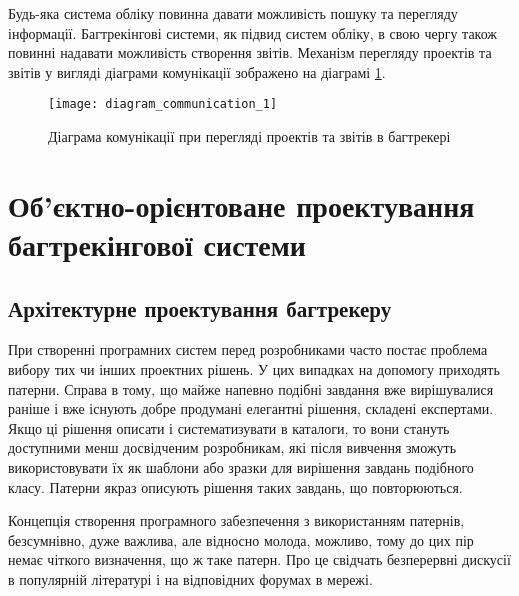 \documentclass[../main.tex]{subfiles}
\begin{document}
	Будь-яка система обліку повинна давати можливість пошуку та перегляду інформації. Багтрекінгові системи, як підвид систем обліку, в свою чергу також повинні надавати можливість створення звітів. Механізм перегляду проектів та звітів у вигляді діаграми комунікації зображено на діаграмі \ref{figure_diag_comm_1}.
	
	\begin{figure}[H]
		\centering
		\texttt{[image: diagram\_communication\_1]}
		\caption{Діаграма комунікації при перегляді проектів та звітів в багтрекері}
		\label{figure_diag_comm_1}
	\end{figure}

\section{Об’єктно-орієнтоване проектування багтрекінгової системи}

	\subsection{Архітектурне проектування багтрекеру}
	
		При створенні програмних систем перед розробниками часто постає проблема вибору тих чи інших проектних рішень. У цих випадках на допомогу приходять патерни. Справа в тому, що майже напевно подібні завдання вже вирішувалися раніше і вже існують добре продумані елегантні рішення, складені експертами. Якщо ці рішення описати і систематизувати в каталоги, то вони стануть доступними менш досвідченим розробникам, які після вивчення зможуть використовувати їх як шаблони або зразки для вирішення завдань подібного класу. Патерни якраз описують рішення таких завдань, що повторюються.~\cite{uml_patterns}
		
		Концепція створення програмного забезпечення з використанням патернів, безсумнівно, дуже важлива, але відносно молода, можливо, тому до цих пір немає чіткого визначення, що ж таке патерн. Про це свідчать безперервні дискусії в популярній літературі і на відповідних форумах в мережі.
		
		
\end{document}
